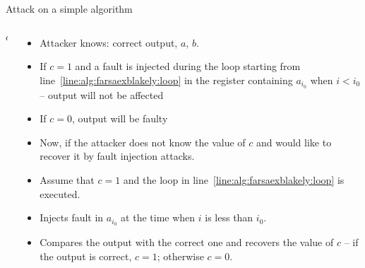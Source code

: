\begin{frame}{Attack on a simple algorithm}
    \begin{columns}[T] %
\begin{column}{.42\textwidth}
{
\setlength{\interspacetitleruled}{0pt}%
\setlength{\algotitleheightrule}{0pt}%
\begin{algorithm}[H]
  	\Return $a$
\end{algorithm}
}
\end{column}%
\hfill%
\begin{column}{.63\textwidth}
 \begin{itemize}
        \item Attacker knows: correct output, $a$, $b$.
        \item If $c=1$ and a fault is injected during the loop starting from line~\ref{line:alg:farsaexblakely:loop} in the register containing $a_{i_0}$ when $i<i_0$ -- output will not be affected
       \item If $c=0$, output will be faulty
       \item Now, if the attacker does not know the value of $c$ and would like to recover it by fault injection attacks.
       \item Assume that $c=1$ and the loop in line~\ref{line:alg:farsaexblakely:loop} is executed.
        \item Injects fault in $a_{i_0}$ at the time when $i$ is less than $i_0$.
       \item Compares the output with the correct one and recovers the value of $c$ -- if the output is correct, $c=1$; otherwise $c=0$.
    \end{itemize}
\end{column}%
\end{columns}
\end{frame}

